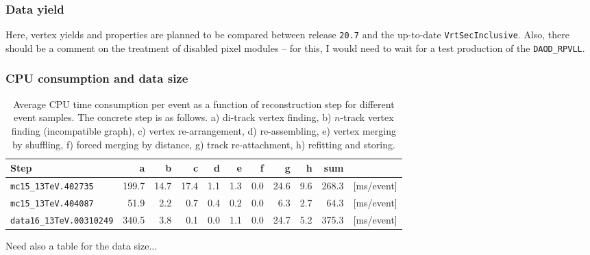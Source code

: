 \subsubsection{Data yield}
Here, vertex yields and properties are planned to be compared between release {\tt 20.7} and the up-to-date {\tt VrtSecInclusive}. Also, there should be a comment on the treatment of disabled pixel modules -- for this, I would need to wait for a test production of the {\tt DAOD\_RPVLL}.

\subsubsection{CPU consumption and data size}

\begin{table}[htbp]
\centering
\caption{Average CPU time consumption per event as a function of reconstruction step for different event samples. The concrete step is as follows. a) di-track vertex finding, b) $n$-track vertex finding (incompatible graph), c) vertex re-arrangement, d) re-assembling, e) vertex merging by shuffling, f) forced merging by distance, g) track re-attachment, h) refitting and storing.}
\begin{tabular}{lrrrrrrrrrr}
\hline
\hline
Step & a & b & c & d & e & f & g & h & sum &\\
\hline
{\tt mc15\_13TeV.402735} & 199.7 & 14.7 & 17.4 & 1.1 & 1.3 & 0.0 & 24.6 & 9.6 & 268.3 & [ms/event]\\
{\tt mc15\_13TeV.404087} & 51.9 & 2.2 & 0.7 & 0.4 & 0.2 & 0.0 & 6.3 & 2.7 & 64.3 & [ms/event]\\
{\tt data16\_13TeV.00310249} & 340.5 & 3.8 & 0.1 & 0.0 & 1.1 & 0.0 & 24.7 & 5.2 & 375.3 & [ms/event]\\
\hline
\hline
\end{tabular}
\label{tbl:default}
\end{table}%

Need also a table for the data size...

